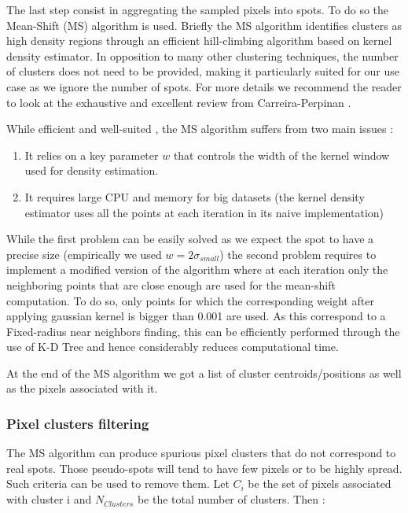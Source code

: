 \documentclass[12pt]{article}
\begin{document}
The last step consist in aggregating the sampled pixels into spots. To do so the Mean-Shift (MS) algorithm is used. Briefly the MS algorithm identifies clusters as high density regions through an efficient hill-climbing algorithm based on kernel density estimator. In opposition to many other clustering techniques, the number of clusters does not need to be provided, making it particularly suited for our use case as we ignore the number of spots.  For more details we recommend the reader to look at the exhaustive and excellent review from Carreira-Perpinan \citep{carreira-perpinan_review_2015}.

 While efficient and well-suited , the MS algorithm suffers from two main issues :
\begin{enumerate}
\item It relies on a key parameter $w$ that controls the width of the kernel window used for density estimation.
\item It requires large CPU and memory  for big datasets (the kernel density estimator uses all the points at each iteration in its naive implementation)
\end{enumerate}

While the first problem can be easily solved as we expect the spot to have a precise size (empirically we used $w = 2\sigma_{small}$) the second problem requires to implement a modified version of the algorithm where at each iteration only the neighboring points that are close enough are used for the mean-shift computation. To do so, only points for which the corresponding weight after applying gaussian kernel  is bigger than 0.001 are used.  As this correspond to a Fixed-radius near neighbors finding, this can be efficiently performed through the use of K-D Tree and hence considerably reduces computational time. 

At the end of the MS algorithm we got a list of cluster centroids/positions as well as the pixels associated with it.

\subsubsection{Pixel clusters filtering}

The MS algorithm can produce spurious pixel clusters that do not correspond to real spots. Those pseudo-spots will tend to have few pixels or to be highly spread. Such criteria can be used to remove them. Let $C_{i}$ be the set of pixels associated with cluster i and $N_{Clusters}$ be the total number of clusters. Then :
\end{document}
